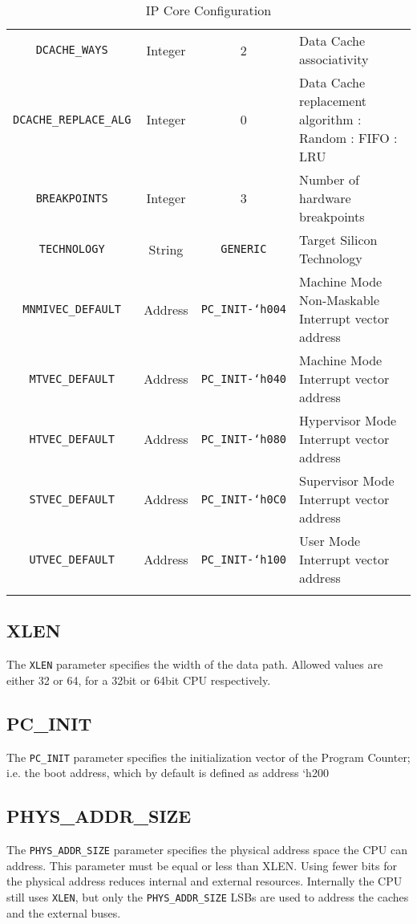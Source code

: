 \begin{longtable}[]{@{}cccp{7cm}@{}}
\texttt{DCACHE\_WAYS}         & Integer & 2 & Data Cache associativity\tabularnewline
\texttt{DCACHE\_REPLACE\_ALG} & Integer & 0 & Data Cache replacement algorithm
\newline0: Random
\newline1: FIFO
\newline2: LRU\tabularnewline
\texttt{BREAKPOINTS}          & Integer & 3 & Number of hardware breakpoints\tabularnewline
\texttt{TECHNOLOGY}           & String  & \texttt{GENERIC} & Target Silicon Technology\tabularnewline
\texttt{MNMIVEC\_DEFAULT}     & Address & \texttt{PC\_INIT-`h004} & Machine Mode Non-Maskable Interrupt vector address\tabularnewline
\texttt{MTVEC\_DEFAULT}       & Address & \texttt{PC\_INIT-`h040} & Machine Mode Interrupt vector address\tabularnewline
\texttt{HTVEC\_DEFAULT}       & Address & \texttt{PC\_INIT-`h080} & Hypervisor Mode Interrupt vector address\tabularnewline
\texttt{STVEC\_DEFAULT}       & Address & \texttt{PC\_INIT-`h0C0} & Supervisor Mode Interrupt vector address\tabularnewline
\texttt{UTVEC\_DEFAULT}       & Address & \texttt{PC\_INIT-`h100} & User Mode Interrupt vector address\tabularnewline
\bottomrule
\caption{IP Core Configuration}
\label{tab:ip-core-configuration}
\end{longtable}


\subsection{XLEN}\label{xlen}

The \texttt{XLEN} parameter specifies the width of the data path. Allowed values
are either 32 or 64, for a 32bit or 64bit CPU respectively.

\subsection{PC\_INIT}\label{pc_init}

The \texttt{PC\_INIT} parameter specifies the initialization vector of the
Program Counter; i.e. the boot address, which by default is defined as
address `h200

\subsection{PHYS\_ADDR\_SIZE}\label{phys_addr_size}

The \texttt{PHYS\_ADDR\_SIZE} parameter specifies the physical address space the
CPU can address. This parameter must be equal or less than XLEN. Using
fewer bits for the physical address reduces internal and external
resources. Internally the CPU still uses \texttt{XLEN}, but only the
\texttt{PHYS\_ADDR\_SIZE} LSBs are used to address the caches and the external
buses.

